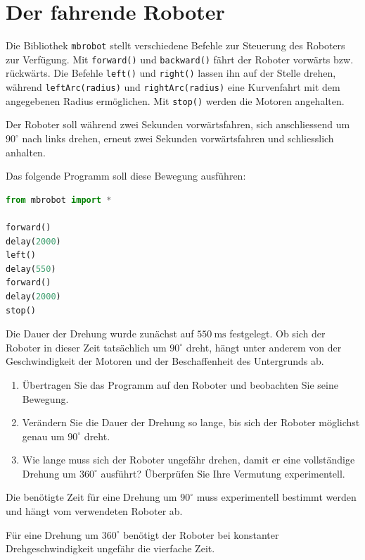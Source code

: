 \section{Der fahrende Roboter}

Die Bibliothek \texttt{mbrobot} stellt verschiedene Befehle
zur Steuerung des Roboters zur Verfügung. Mit
\texttt{forward()} und \texttt{backward()} fährt der Roboter
vorwärts bzw. rückwärts. Die Befehle \texttt{left()} und
\texttt{right()} lassen ihn auf der Stelle drehen, während
\texttt{leftArc(radius)} und \texttt{rightArc(radius)}
eine Kurvenfahrt mit dem angegebenen Radius ermöglichen.
Mit \texttt{stop()} werden die Motoren angehalten.


\begin{myexercise}

    Der Roboter soll während zwei Sekunden vorwärtsfahren,
    sich anschliessend um \(90^\circ\) nach links drehen,
    erneut zwei Sekunden vorwärtsfahren und schliesslich
    anhalten.

    Das folgende Programm soll diese Bewegung ausführen:

    \begin{lstlisting}[language=Python]
from mbrobot import *

forward()
delay(2000)
left()
delay(550)
forward()
delay(2000)
stop()
    \end{lstlisting}

    Die Dauer der Drehung wurde zunächst auf
    \(\SI{550}{\milli\second}\) festgelegt. Ob sich der
    Roboter in dieser Zeit tatsächlich um \(90^\circ\)
    dreht, hängt unter anderem von der Geschwindigkeit
    der Motoren und der Beschaffenheit des Untergrunds ab.

    \begin{enumerate}
        \item Übertragen Sie das Programm auf den Roboter
              und beobachten Sie seine Bewegung.

        \item Verändern Sie die Dauer der Drehung so lange,
              bis sich der Roboter möglichst genau um
              \(90^\circ\) dreht.

        \item Wie lange muss sich der Roboter ungefähr
              drehen, damit er eine vollständige
              Drehung um \(360^\circ\) ausführt?
              Überprüfen Sie Ihre Vermutung experimentell.
    \end{enumerate}

    \begin{myanswer}
        Die benötigte Zeit für eine Drehung um \(90^\circ\)
        muss experimentell bestimmt werden und hängt
        vom verwendeten Roboter ab.

        Für eine Drehung um \(360^\circ\) benötigt der
        Roboter bei konstanter Drehgeschwindigkeit
        ungefähr die vierfache Zeit.
    \end{myanswer}
\end{myexercise}


